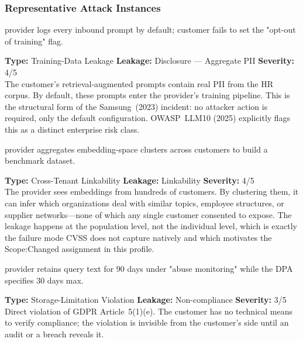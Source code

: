 \documentclass[11pt,a4paper]{report}
\begin{document}
\subsubsection{Representative Attack Instances}

\vspace{4pt}
\begin{attackbox}
  provider logs every inbound prompt by default;
        customer fails to set the "opt-out of training" flag.
\end{attackbox}
\begin{prosebox}
\small\textbf{Type:} Training-Data Leakage \quad
\textbf{Leakage:} Disclosure --- Aggregate PII \quad \textbf{Severity:} 4/5\\[2pt]
The customer's retrieval-augmented prompts contain real PII from the HR
corpus. By default, these prompts enter the provider's training pipeline.
This is the structural form of the Samsung~(2023) incident: no attacker
action is required, only the default configuration. OWASP~LLM10 (2025)
explicitly flags this as a distinct enterprise risk class.
\end{prosebox}

\vspace{4pt}
\begin{attackbox}
  provider aggregates embedding-space
        clusters across customers to build a benchmark dataset.
\end{attackbox}
\begin{prosebox}
\small\textbf{Type:} Cross-Tenant Linkability \quad
\textbf{Leakage:} Linkability \quad \textbf{Severity:} 4/5\\[2pt]
The provider sees embeddings from hundreds of customers. By clustering
them, it can infer which organizations deal with similar topics, employee
structures, or supplier networks---none of which any single customer
consented to expose. The leakage happens at the population level, not
the individual level, which is exactly the failure mode CVSS does not
capture natively and which motivates the Scope:Changed assignment
in this profile.
\end{prosebox}

\vspace{4pt}
\begin{attackbox}
  provider retains query text for 90 days
        under "abuse monitoring" while the DPA specifies 30 days max.
\end{attackbox}
\begin{prosebox}
\small\textbf{Type:} Storage-Limitation Violation \quad
\textbf{Leakage:} Non-compliance \quad \textbf{Severity:} 3/5\\[2pt]
Direct violation of GDPR Article~5(1)(e). The customer has no technical
means to verify compliance; the violation is invisible from the customer's
side until an audit or a breach reveals it.
\end{prosebox}
\end{document}

